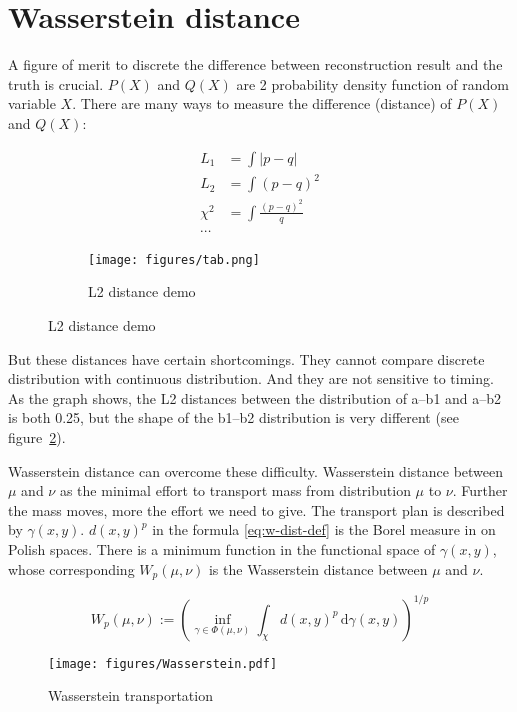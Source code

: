 \section{Wasserstein distance} %
A figure of merit to discrete the difference between reconstruction result and the truth is crucial. $P(X)$ and $Q(X)$ are 2 probability density function of random variable $X$. There are many ways to measure the difference (distance) of $P(X)$ and $Q(X)$: 

\begin{figure}[H]
\begin{minipage}{.25\textwidth}
\begin{align*}
    L_{1} &= \int|p-q| \\
    L_{2} &= \int(p-q)^{2} \\
    \chi^{2} &= \int\frac{(p-q)^{2}}{q} \\
    \cdots
\end{align*}
\end{minipage}
\begin{minipage}{.7\textwidth}
\begin{figure}[H]
    \centering
    \texttt{[image: figures/tab.png]}
    \caption{\label{fig:l2} L2 distance demo}
\end{figure}
\end{minipage}
\end{figure}

But these distances have certain shortcomings. They cannot compare discrete distribution with continuous distribution. And they are not sensitive to timing. As the graph shows, the L2 distances between the distribution of a--b1 and a--b2 is both 0.25, but the shape of the b1--b2 distribution is very different (see figure~\ref{fig:l2}). 

Wasserstein distance can overcome these difficulty. Wasserstein distance between $\mu$ and $\nu$ as the minimal effort to transport mass from distribution $\mu$ to $\nu$. Further the mass moves, more the effort we need to give. The transport plan is described by $\gamma(x, y)$. $d(x,y)^{p}$ in the formula \eqref{eq:w-dist-def} is the Borel measure in
on Polish spaces. There is a minimum function in the functional space of $\gamma(x, y)$, whose corresponding $W_{p}(\mu ,\nu)$ is the Wasserstein distance between $\mu$ and $\nu$. 

\label{sub:Wasserstein distance}
    \begin{equation}
        W_{p}(\mu,\nu):=\left(\inf_{\gamma\in\Phi(\mu,\nu)}\int_{\chi}d(x,y)^{p}\,\mathrm{d}\gamma(x,y)\right)^{1/p}
        \label{eq:w-dist-def}
    \end{equation}
    \begin{figure}[H]
        \centering
            \texttt{[image: figures/Wasserstein.pdf]}
        \caption{\label{fig:Wasserstein transportation} Wasserstein transportation}
    \end{figure}

